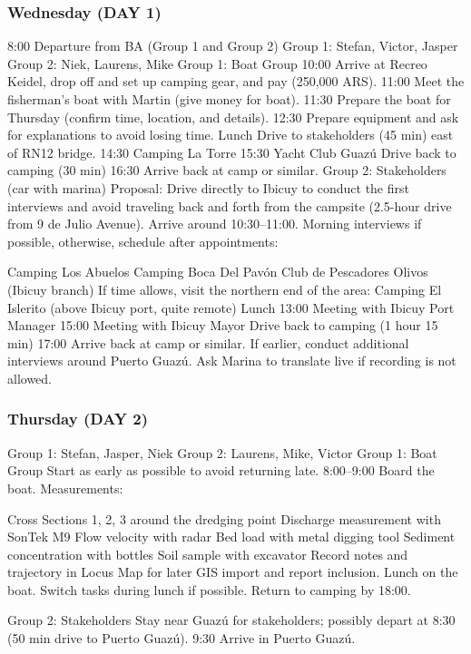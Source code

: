 \subsubsection{Wednesday (DAY 1)}
8:00 Departure from BA (Group 1 and Group 2)
Group 1: Stefan, Victor, Jasper
Group 2: Niek, Laurens, Mike
Group 1: Boat Group
10:00 Arrive at Recreo Keidel, drop off and set up camping gear, and pay (250,000 ARS).
11:00 Meet the fisherman’s boat with Martin (give money for boat).
11:30 Prepare the boat for Thursday (confirm time, location, and details).
12:30 Prepare equipment and ask for explanations to avoid losing time.
Lunch
Drive to stakeholders (45 min) east of RN12 bridge.
14:30 Camping La Torre
15:30 Yacht Club Guazú
Drive back to camping (30 min)
16:30 Arrive back at camp or similar.
Group 2: Stakeholders (car with marina)
Proposal: Drive directly to Ibicuy to conduct the first interviews and avoid traveling back and forth from the campsite (2.5-hour drive from 9 de Julio Avenue).
Arrive around 10:30–11:00.
Morning interviews if possible, otherwise, schedule after appointments:

Camping Los Abuelos
Camping Boca Del Pavón
Club de Pescadores Olivos (Ibicuy branch)
If time allows, visit the northern end of the area:
Camping El Islerito (above Ibicuy port, quite remote)
Lunch
13:00 Meeting with Ibicuy Port Manager
15:00 Meeting with Ibicuy Mayor
Drive back to camping (1 hour 15 min)
17:00 Arrive back at camp or similar. If earlier, conduct additional interviews around Puerto Guazú.
Ask Marina to translate live if recording is not allowed.


\subsubsection{Thursday (DAY 2)}
Group 1: Stefan, Jasper, Niek
Group 2: Laurens, Mike, Victor
Group 1: Boat Group
Start as early as possible to avoid returning late.
8:00–9:00 Board the boat.
Measurements:

Cross Sections 1, 2, 3 around the dredging point
Discharge measurement with SonTek M9
Flow velocity with radar
Bed load with metal digging tool
Sediment concentration with bottles
Soil sample with excavator
Record notes and trajectory in Locus Map for later GIS import and report inclusion.
Lunch on the boat.
Switch tasks during lunch if possible.
Return to camping by 18:00.

Group 2: Stakeholders
Stay near Guazú for stakeholders; possibly depart at 8:30 (50 min drive to Puerto Guazú).
9:30 Arrive in Puerto Guazú.

